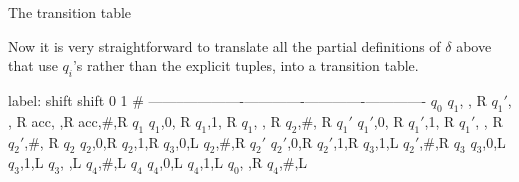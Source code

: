 \documentclass[
  ignorenonframetext,
]{beamer}
\begin{document}
\begin{frame}{The transition table}
\protect\hypertarget{the-transition-table}{}

Now it is very straightforward to translate all the partial definitions
of \(\delta\) above that use \(q_i\)'s rather than the explicit tuples,
into a transition table.

label: shift \textbar{} shift \textbar{} 0 \textbar{} 1 \textbar{}
\textbar{} \# \textbar{}
\textbar--------\textbar-------------\textbar-------------\textbar-------------\textbar-------------\textbar{}
\textbar{} \(q_0\) \textbar{} \(q_1\), , R \textbar{} \(q_1'\), , R
\textbar{} acc, ,R \textbar{} acc,\#,R \textbar{} \textbar{} \(q_1\)
\textbar{} \(q_1\),0, R \textbar{} \(q_1\),1, R \textbar{} \(q_1\), , R
\textbar{} \(q_2\),\#, R \textbar{} \textbar{} \(q_1'\) \textbar{}
\(q_1'\),0, R \textbar{} \(q_1'\),1, R \textbar{} \(q_1'\), , R
\textbar{} \(q_2'\),\#, R \textbar{} \textbar{} \(q_2\) \textbar{}
\(q_2\),0,R \textbar{} \(q_2\),1,R \textbar{} \(q_3\),0,L \textbar{}
\(q_2\),\#,R \textbar{} \textbar{} \(q_2'\) \textbar{} \(q_2'\),0,R
\textbar{} \(q_2'\),1,R \textbar{} \(q_3\),1,L \textbar{} \(q_2'\),\#,R
\textbar{} \textbar{} \(q_3\) \textbar{} \(q_3\),0,L \textbar{}
\(q_3\),1,L \textbar{} \(q_3\), ,L \textbar{} \(q_4\),\#,L \textbar{}
\textbar{} \(q_4\) \textbar{} \(q_4\),0,L \textbar{} \(q_4\),1,L
\textbar{} \(q_0\), ,R \textbar{} \(q_4\),\#,L \textbar{}

\end{frame}
\end{document}
